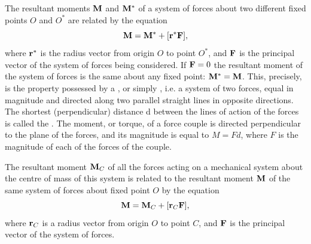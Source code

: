 \subsection{}\label{4.1.6} The resultant moments $\vb{M}$ and $\vb{M}^{*}$ of a system of forces about two different fixed points $O$ and $O^{*}$ are related by the equation
\begin{equation*}%
\vb{M} = \vb{M}^{*} + \qty[\vb{r}^{*}\vb{F}],
\end{equation*}
where $\vb{r}^{*}$ is the radius vector from origin $O$ to point $O^{*}$, and $\vb{F}$ is the principal vector of the system of forces being considered. If $\vb{F} = 0$ the resultant moment of the system of forces is the same about any fixed point: $\vb{M}^{*} = \vb{M}$. This, precisely, is the property possessed by a , or simply , i.e. a system of two forces, equal in magnitude and directed along two parallel straight lines in opposite directions. The shortest (perpendicular) distance d between the lines of action of the forces is called the . The moment, or torque, of a force couple is directed perpendicular to the plane of the forces, and its magnitude is equal to $M = Fd$, where $F$ is the magnitude of each of the forces of the couple.

The resultant moment $\vb{M}_{C}$ of all the forces acting on a mechan­ical system about the centre of mass  of this system is related to the resultant moment $\vb{M}$ of the same system of forces about fixed point $O$ by the equation
\begin{equation*}%
\vb{M} = \vb{M}_{C} + \qty[\vb{r}_{C}\vb{F}],
\end{equation*}
where $\vb{r}_{C}$ is a radius vector from origin $O$ to point $C$, and $\vb{F}$ is the principal vector of the system of forces.

